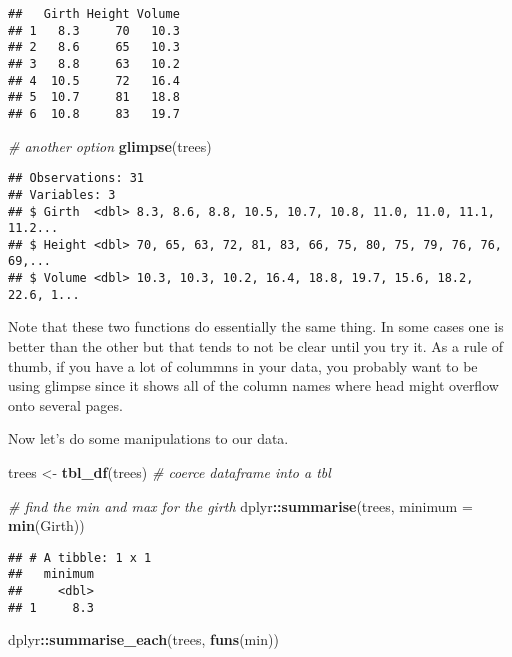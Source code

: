 \documentclass[]{article}
\newenvironment{Shaded}{\begin{snugshade}}{\end{snugshade}}
\newcommand{\CommentTok}[1]{\textcolor[rgb]{0.56,0.35,0.01}{\textit{#1}}}
\newcommand{\DataTypeTok}[1]{\textcolor[rgb]{0.13,0.29,0.53}{#1}}
\newcommand{\KeywordTok}[1]{\textcolor[rgb]{0.13,0.29,0.53}{\textbf{#1}}}
\newcommand{\NormalTok}[1]{#1}
\newcommand{\OperatorTok}[1]{\textcolor[rgb]{0.81,0.36,0.00}{\textbf{#1}}}
\newcommand{\StringTok}[1]{\textcolor[rgb]{0.31,0.60,0.02}{#1}}
\begin{document}
\begin{verbatim}
##   Girth Height Volume
## 1   8.3     70   10.3
## 2   8.6     65   10.3
## 3   8.8     63   10.2
## 4  10.5     72   16.4
## 5  10.7     81   18.8
## 6  10.8     83   19.7
\end{verbatim}

\begin{Shaded}
\begin{Highlighting}[]
\CommentTok{# another option}
\KeywordTok{glimpse}\NormalTok{(trees)}
\end{Highlighting}
\end{Shaded}

\begin{verbatim}
## Observations: 31
## Variables: 3
## $ Girth  <dbl> 8.3, 8.6, 8.8, 10.5, 10.7, 10.8, 11.0, 11.0, 11.1, 11.2...
## $ Height <dbl> 70, 65, 63, 72, 81, 83, 66, 75, 80, 75, 79, 76, 76, 69,...
## $ Volume <dbl> 10.3, 10.3, 10.2, 16.4, 18.8, 19.7, 15.6, 18.2, 22.6, 1...
\end{verbatim}

Note that these two functions do essentially the same thing. In some
cases one is better than the other but that tends to not be clear until
you try it. As a rule of thumb, if you have a lot of colummns in your
data, you probably want to be using glimpse since it shows all of the
column names where head might overflow onto several pages.

Now let's do some manipulations to our data.

\begin{Shaded}
\begin{Highlighting}[]
\NormalTok{trees <-}\StringTok{ }\KeywordTok{tbl_df}\NormalTok{(trees) }\CommentTok{# coerce dataframe into a tbl }

\CommentTok{# find the min and max for the girth }
\NormalTok{dplyr}\OperatorTok{::}\KeywordTok{summarise}\NormalTok{(trees, }\DataTypeTok{minimum =} \KeywordTok{min}\NormalTok{(Girth))}
\end{Highlighting}
\end{Shaded}

\begin{verbatim}
## # A tibble: 1 x 1
##   minimum
##     <dbl>
## 1     8.3
\end{verbatim}

\begin{Shaded}
\begin{Highlighting}[]
\NormalTok{dplyr}\OperatorTok{::}\KeywordTok{summarise_each}\NormalTok{(trees, }\KeywordTok{funs}\NormalTok{(min))}
\end{Highlighting}
\end{Shaded}
\end{document}
